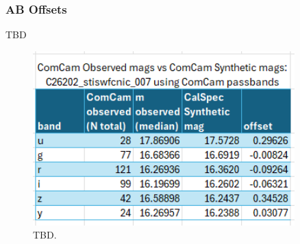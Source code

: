 \subsubsection{AB Offsets}

TBD

\begin{figure}
  \begin{center}
    \includegraphics[width=0.9\textwidth]{photometric_calibration_figures/AB_offset_stiswfcnic_007.PNG}
  \end{center}
  \caption{TBD.}
\end{figure}




